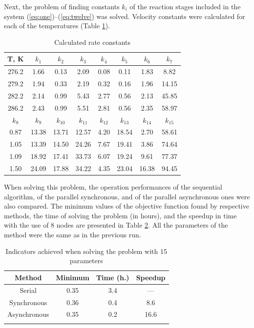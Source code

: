 \documentclass{svproc}
\begin{document}
Next, the problem of finding constants $k_i$ of the reaction stages included in the system (\ref{eq:one})--(\ref{eq:twelve}) was solved. Velocity constants were calculated for each of the temperatures (Table \ref{table_res2}).

\begin{table}[ht]
\caption{Calculated rate constants}\label{table_res2}
\begin{center}
\begin{tabular}{cccccccc}
\hline
T, K & $k_1$ & $k_2$ & $k_3$ & $k_4$ & $k_5$ & $k_6$ & $k_7$\\
\hline\rule{0pt}{12pt}
276.2 & 1.66 & 0.13 & 2.09 & 0.08 & 0.11 & 1.83 & 8.82 \\
279.2 & 1.94 & 0.33 & 2.19 & 0.32 & 0.16 & 1.96 & 14.15\\
282.2 & 2.14 & 0.99 & 5.43 & 2.77 & 0.56 & 2.13 & 45.85\\
286.2 & 2.43 & 0.99 & 5.51 & 2.81 & 0.56  & 2.35 & 58.97\\
\hline
$k_8$ & $k_9$ & $k_{10}$ & $k_{11}$ & $k_{12}$ & $k_{13}$ & $k_{14}$ & $k_{15}$ \\
\hline\rule{0pt}{12pt}
0.87 & 13.38 & 13.71 & 12.57 & 4.20 & 18.54 & 2.70 & 58.61\\
1.05 & 13.39 & 14.50 & 24.26 & 7.67 & 19.41 & 3.86 & 74.64\\
1.09 & 18.92 & 17.41 & 33.73 & 6.07 & 19.24 & 9.61 & 77.37\\
1.50 & 24.09 & 17.88 & 34.22 & 4.35 & 23.04 & 16.38 & 94.45\\[2pt]
\hline
\end{tabular}\end{center}\end{table}

When solving this problem, the operation performances of the sequential algorithm, of the parallel synchronous, and of the parallel asynchronous ones were also compared.  
The minimum values of the objective function found by respective methods, the time of solving the problem (in hours), and the speedup in time with the use of 8 nodes are presented in Table \ref{table_15D}. All the parameters of the method were the same as in the previous run. 

\begin{table}
\caption{Indicators achieved when solving the problem with 15 parameters}
\label{table_15D}
\begin{center}
\begin{tabular}{cccc}
\hline\noalign{\smallskip}
 Method      & Minimum  & Time (h.) & Speedup \\
\hline\noalign{\smallskip}
Serial       & 0.35   &   3.4     &  ---        \\
Synchronous  & 0.36   &   0.4     &   8.6       \\
Asynchronous & 0.35   &   0.2     &   16.6       \\
\noalign{\smallskip}\hline
\end{tabular}\end{center}\end{table}
\end{document}
